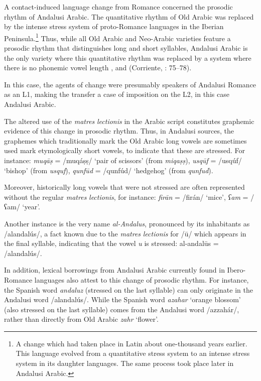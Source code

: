\documentclass[output=paper,modfonts,nonflat]{langsci/langscibook}
\begin{document}
A contact-induced language change from Romance concerned the prosodic rhythm of Andalusi Arabic. The quantitative rhythm of Old Arabic was replaced by the intense stress system of proto-Romance languages in the Iberian Peninsula.\footnote{A change which had taken place in Latin about one-thousand years earlier. This language evolved from a quantitative stress system to an intense stress system in its daughter languages. The same process took place later in Andalusi Arabic.} Thus, while all Old Arabic and Neo-Arabic varieties feature a prosodic rhythm that distinguishes long and short syllables, Andalusi Arabic is the only variety where this quantitative rhythm was replaced by a system where there is no phonemic vowel length \citep{Corriente1977}, \citep{Corriente1992} and (Corriente, \citealt{PereiraVicente2015}: 75–78).

In this case, the agents of change were presumably speakers of Andalusi Romance as an L1, making the transfer a case of imposition on the L2, in this case Andalusi Arabic. 

The altered use of the \textit{matres} \textit{lectionis} in the Arabic script constitutes graphemic evidence of this change in prosodic rhythm. Thus, in Andalusi sources, the graphemes which traditionally mark the Old Arabic long vowels are sometimes used mark etymologically short vowels, to indicate that these are stressed. For instance: {} \textit{{muqāṣ}} = /muqáṣṣ/ ‘pair of scissors’ (from \textit{miqaṣṣ}), {} \textit{usqūf} = /usqúf/ ‘bishop’ (from \textit{usquf}), {} \textit{qunfūd} = /qunfúd/ ‘hedgehog’ (from \textit{qunfud}).  

Moreover, historically long vowels that were not stressed are often represented without the regular \textit{matres} \textit{lectionis}, for instance: {} \textit{firān} = /firán/ ‘mice’, {} \textit{ʕam} = /ʕam/ ‘year’.

Another instance is the very name \textit{al-Andalus}, pronounced by its inhabitants as /alandalús/, a fact known due to the \textit{matres} \textit{lectionis} for /ū/ which appears in the final syllable, indicating that the vowel \textit{u} is stressed: {} al-andalūs = /alandalús/.

In addition, lexical borrowings from Andalusi Arabic currently found in Ibero-Romance languages also attest to this change of prosodic rhythm. For instance, the Spanish word \textit{andaluz} (stressed on the last syllable) can only originate in the Andalusi word /alandalús/. While the Spanish word \textit{azahar} ‘orange blossom’ (also stressed on the last syllable) comes from the Andalusi word /azzahár/, rather than directly from Old Arabic \textit{zahr} ‘flower’.
\end{document}
